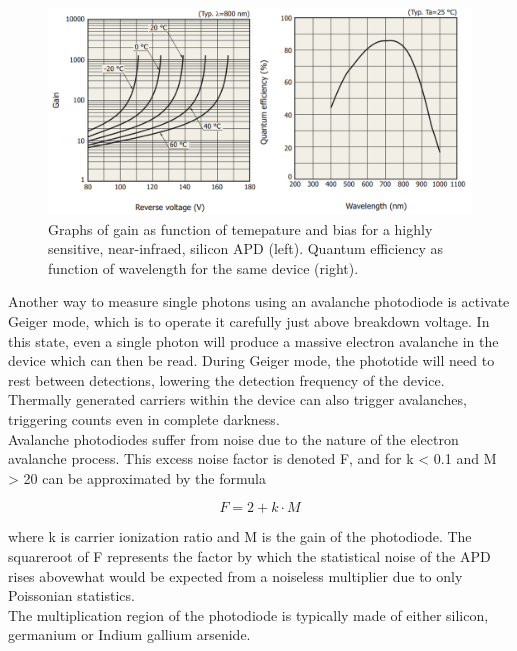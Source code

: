 \begin{figure}[htb]
\begin{center}
\includegraphics[scale=0.6]{figures/RCS/APD_specs}
\caption{Graphs of gain as function of temepature and bias for a highly sensitive, near-infraed, silicon APD (left). Quantum efficiency as function of wavelength for the same device (right).}
\label{fig:APD_specs}
\end{center}
\end{figure}

Another way to measure single photons using an avalanche photodiode is activate Geiger mode, which is to operate it carefully just above breakdown voltage. In this state, even a single photon will produce a massive electron avalanche in the device which can then be read. During Geiger mode, the phototide will need to rest between detections, lowering the detection frequency of the device. Thermally generated carriers within the device can also trigger avalanches, triggering counts even in complete darkness.\\

Avalanche photodiodes suffer from noise due to the nature of the electron avalanche process. This excess noise factor is denoted F, and for k < 0.1 and M > 20 can be approximated by the formula

\begin{equation}
    F = 2 + k \cdot M
\end{equation}

where k is carrier ionization ratio and M is the gain of the photodiode. The squareroot of F represents the factor by which the statistical noise of the APD rises abovewhat would be expected from a noiseless multiplier due to only Poissonian statistics.\\

The  multiplication region of the photodiode is typically made of either silicon, germanium or Indium gallium arsenide.

